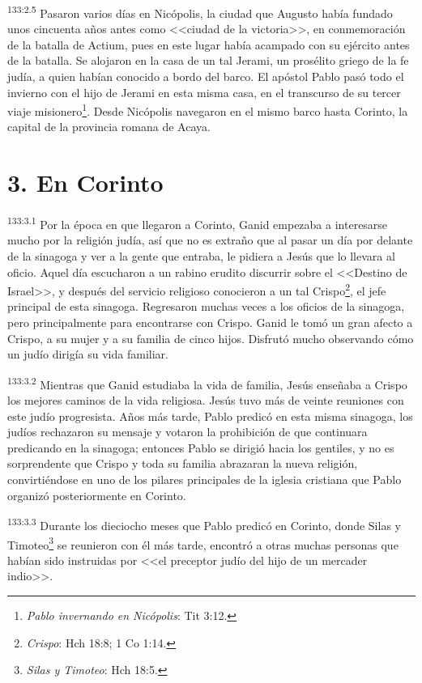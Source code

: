 \par 
\textsuperscript{133:2.5} Pasaron varios días en Nicópolis, la ciudad que Augusto había fundado unos cincuenta años antes como <<ciudad de la victoria>>, en conmemoración de la batalla de Actium, pues en este lugar había acampado con su ejército antes de la batalla. Se alojaron en la casa de un tal Jerami, un prosélito griego de la fe judía, a quien habían conocido a bordo del barco. El apóstol Pablo pasó todo el invierno con el hijo de Jerami en esta misma casa, en el transcurso de su tercer viaje misionero\footnote{\textit{Pablo invernando en Nicópolis}: Tit 3:12.}. Desde Nicópolis navegaron en el mismo barco hasta Corinto, la capital de la provincia romana de Acaya.

\section*{3. En Corinto}
\par 
\textsuperscript{133:3.1} Por la época en que llegaron a Corinto, Ganid empezaba a interesarse mucho por la religión judía, así que no es extraño que al pasar un día por delante de la sinagoga y ver a la gente que entraba, le pidiera a Jesús que lo llevara al oficio. Aquel día escucharon a un rabino erudito discurrir sobre el <<Destino de Israel>>, y después del servicio religioso conocieron a un tal Crispo\footnote{\textit{Crispo}: Hch 18:8; 1 Co 1:14.}, el jefe principal de esta sinagoga. Regresaron muchas veces a los oficios de la sinagoga, pero principalmente para encontrarse con Crispo. Ganid le tomó un gran afecto a Crispo, a su mujer y a su familia de cinco hijos. Disfrutó mucho observando cómo un judío dirigía su vida familiar.

\par 
\textsuperscript{133:3.2} Mientras que Ganid estudiaba la vida de familia, Jesús enseñaba a Crispo los mejores caminos de la vida religiosa. Jesús tuvo más de veinte reuniones con este judío progresista. Años más tarde, Pablo predicó en esta misma sinagoga, los judíos rechazaron su mensaje y votaron la prohibición de que continuara predicando en la sinagoga; entonces Pablo se dirigió hacia los gentiles, y no es sorprendente que Crispo y toda su familia abrazaran la nueva religión, convirtiéndose en uno de los pilares principales de la iglesia cristiana que Pablo organizó posteriormente en Corinto.

\par 
\textsuperscript{133:3.3} Durante los dieciocho meses que Pablo predicó en Corinto, donde Silas y Timoteo\footnote{\textit{Silas y Timoteo}: Hch 18:5.} se reunieron con él más tarde, encontró a otras muchas personas que habían sido instruidas por <<el preceptor judío del hijo de un mercader indio>>.

